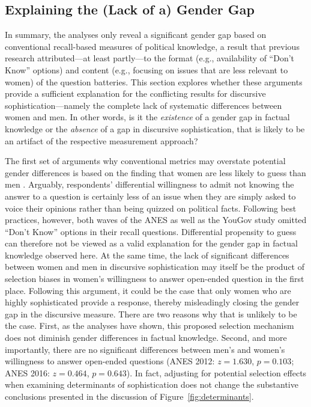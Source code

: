 \subsection*{Explaining the (Lack of a) Gender Gap}

In summary, the analyses only reveal a significant gender gap based on conventional recall-based measures of political knowledge, a result that previous research attributed---at least partly---to the format (e.g., availability of ``Don't Know'' options) and content (e.g., focusing on issues that are less relevant to women) of the question batteries. This section explores whether these arguments provide a sufficient explanation for the conflicting results for discursive sophistication---namely the complete lack of systematic differences between women and men. In other words, is it the \textit{existence} of a gender gap in factual knowledge or the \textit{absence} of a gap in discursive sophistication, that is likely to be an artifact of the respective measurement approach?

The first set of arguments why conventional metrics may overstate potential gender differences is based on the finding that women are less likely to guess than men \citep{mondak2004knowledge}. Arguably, respondents' differential willingness to admit not knowing the answer to a question is certainly less of an issue when they are simply asked to voice their opinions rather than being quizzed on political facts. Following best practices, however, both waves of the ANES as well as the YouGov study omitted ``Don't Know'' options in their recall questions. Differential propensity to guess can therefore not be viewed as a valid explanation for the gender gap in factual knowledge observed here. At the same time, the lack of significant differences between women and men in discursive sophistication may itself be the product of selection biases in women's willingness to answer open-ended question in the first place. Following this argument, it could be the case that only women who are highly sophisticated provide a response, thereby misleadingly closing the gender gap in the discursive measure. There are two reasons why that is unlikely to be the case. First, as the analyses have shown, this proposed selection mechanism does not diminish gender differences in factual knowledge. Second, and more importantly, there are no significant differences between men's and women's willingness to answer open-ended questions (ANES 2012: $z = 1.630$, $p = 0.103$; ANES 2016: $z = 0.464$, $p = 0.643$). In fact, adjusting for potential selection effects when examining determinants of sophistication does not change the substantive conclusions presented in the discussion of Figure~\ref{fig:determinants}.

